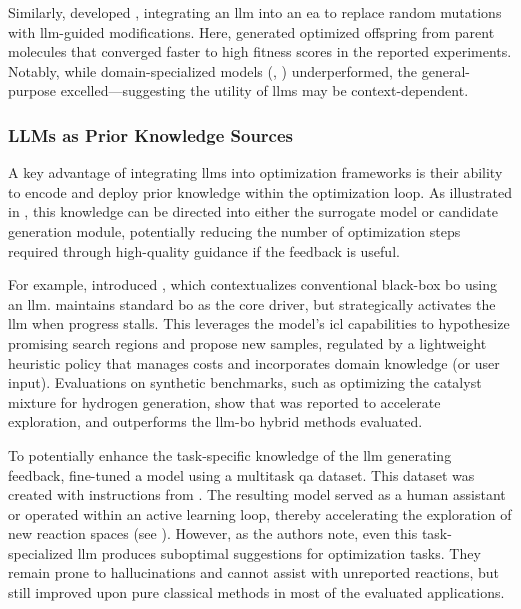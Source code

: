 Similarly, \textcite{wang2024efficient} developed , integrating an \gls{llm} into an \gls{ea} to replace random mutations with \gls{llm}-guided modifications. Here,  generated optimized offspring from parent molecules that converged faster to high fitness scores in the reported experiments. 
Notably, while domain-specialized models (, ) underperformed, the general-purpose  excelled---suggesting the utility of \glspl{llm} may be context-dependent.


\subsubsection{LLMs as Prior Knowledge Sources} \label{sec:opt-llm-know-source}

A key advantage of integrating \glspl{llm} into optimization frameworks is their ability to encode and deploy prior knowledge within the optimization loop. 
As illustrated in , this knowledge can be directed into either the surrogate model or candidate generation module, potentially reducing the number of optimization steps required through high-quality guidance if the feedback is useful.

For example, \textcite{cisse2025language0based} introduced , which contextualizes conventional black-box \gls{bo} using an \gls{llm}.  maintains standard \gls{bo} as the core driver, but strategically activates the \gls{llm} when progress stalls. 
This leverages the model’s \gls{icl} capabilities to hypothesize promising search regions and propose new samples, regulated by a lightweight heuristic policy that manages costs and incorporates domain knowledge (or user input). 
Evaluations on synthetic benchmarks, such as optimizing the catalyst mixture for hydrogen generation, show that  was reported to accelerate exploration, and outperforms the \gls{llm}-\gls{bo} hybrid methods evaluated.

To potentially enhance the task-specific knowledge of the \gls{llm} generating feedback, \textcite{zhang2025large} fine-tuned a  model using a multitask \gls{qa} dataset. This dataset was created with instructions from . 
The resulting model served as a human assistant or operated within an active learning loop, thereby accelerating the exploration of new reaction spaces (see ). 
However, as the authors note, even this task-specialized \gls{llm} produces suboptimal suggestions for optimization tasks. 
They remain prone to hallucinations and cannot assist with unreported reactions, but still improved upon pure classical methods in most of the evaluated applications.


